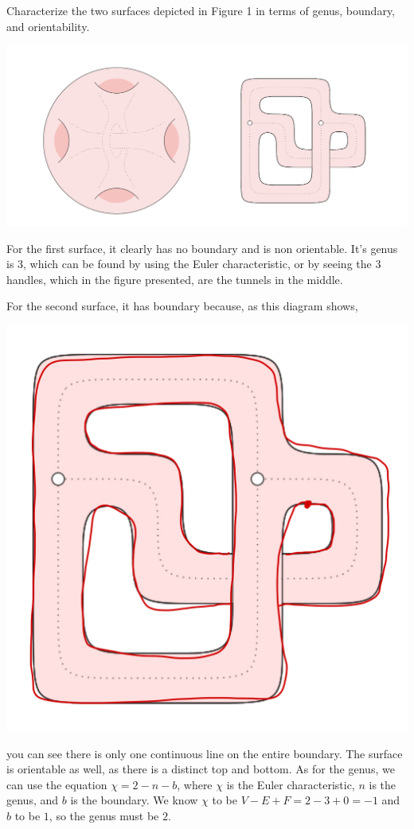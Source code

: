 \documentclass[12pt]{article}
\begin{document}
\begin{statement}
   Characterize the two surfaces depicted in Figure 1  in terms of genus, boundary, and orientability.
   \par \begin{center} \includegraphics[scale=.5]{4-1.png} \end{center}
\end{statement}
\begin{newproof}
  For the first surface, it clearly has no boundary and is non orientable. It's genus is 3, which can be found by using 
  the Euler characteristic, or by seeing the 3 handles, which in the figure presented, are the tunnels in the middle.
  \par For the second surface, it has boundary because, as this diagram shows,
  \par \begin{center} \includegraphics[scale=.1]{4-2.jpg} \end{center}
  you can see there is only one continuous line on the entire boundary. The surface is orientable as well, as there is a 
  distinct top and bottom. As for the genus, we can use the equation $\chi=2-n-b$, where $\chi$ is the Euler characteristic,
  $n$ is the genus, and $b$ is the boundary. We know $\chi$ to be $V-E+F=2-3+0=-1$ and $b$ to be $1$, so the genus must be $2$.
\end{newproof}
\end{document}
